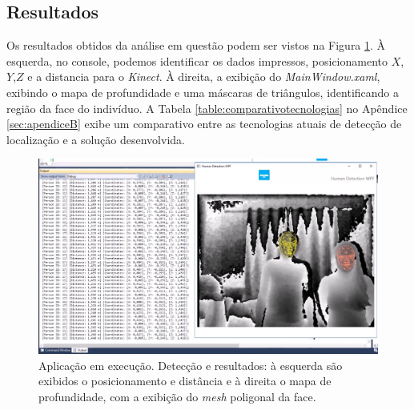 \subsection{Resultados}
Os resultados obtidos da análise em questão podem ser vistos na Figura \ref{fig:results}. À esquerda, no console, podemos identificar os dados impressos, posicionamento $X$, $Y$,$Z$ e a distancia para o \textit{Kinect}. À direita, a exibição do \textit{MainWindow.xaml}, exibindo o mapa de profundidade e uma máscaras de triângulos, identificando a região da face do indivíduo. A Tabela \ref{table:comparativotecnologias} no Apêndice \ref{sec:apendiceB} exibe um comparativo entre as tecnologias atuais de detecção de localização e a solução desenvolvida.

\begin{figure}[ht]
\centering
\includegraphics[width=1.0\textwidth]{images/detection01.png}
\caption{Aplicação em execução. Detecção e resultados: à esquerda são exibidos o posicionamento e distância e à direita o mapa de profundidade, com a exibição do \textit{mesh} poligonal da face.}
\label{fig:results}
\end{figure}
